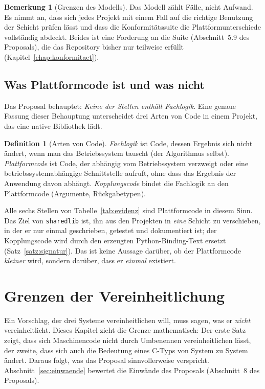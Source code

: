 \documentclass[a4paper,12pt,twoside]{report}
\DeclareRobustCommand{\_}{\ifmmode\mbox{\textunderscore}\else\textunderscore\allowbreak{}\fi}
\theoremstyle{definition}
\newtheorem{definition}{Definition}[chapter]
\newtheorem{bemerkung}{Bemerkung}[chapter]
\begin{document}
\begin{bemerkung}[Grenzen des Modells]
	Das Modell zählt Fälle, nicht Aufwand. Es nimmt an, dass sich jedes Projekt mit einem Fall auf die richtige Benutzung der Schicht prüfen lässt und dass die Konformitätssuite die Plattformunterschiede vollständig abdeckt. Beides ist eine Forderung an die Suite (Abschnitt~5.9 des Proposals), die das Repository bisher nur teilweise erfüllt (Kapitel~\ref{chap:konformitaet}).
\end{bemerkung}

\section{Was Plattformcode ist und was nicht}

Das Proposal behauptet: \emph{Keine der Stellen enthält Fachlogik}. Eine genaue Fassung dieser Behauptung unterscheidet drei Arten von Code in einem Projekt, das eine native Bibliothek lädt.

\begin{definition}[Arten von Code]
	\emph{Fachlogik} ist Code, dessen Ergebnis sich nicht ändert, wenn man das Betriebssystem tauscht (der Algorithmus selbst). \emph{Plattformcode} ist Code, der abhängig vom Betriebssystem verzweigt oder eine betriebssystemabhängige Schnittstelle aufruft, ohne dass das Ergebnis der Anwendung davon abhängt. \emph{Kopplungscode} bindet die Fachlogik an den Plattformcode (Argumente, Rückgabetypen).
\end{definition}

Alle sechs Stellen von Tabelle~\ref{tab:evidenz} sind Plattformcode in diesem Sinn. Das Ziel von \texttt{sharedlib} ist, ihn aus den Projekten in \emph{eine} Schicht zu verschieben, in der er nur einmal geschrieben, getestet und dokumentiert ist; der Kopplungscode wird durch den erzeugten Python-Binding-Text ersetzt (Satz~\ref{satz:signatur}). Das ist keine Aussage darüber, ob der Plattformcode \emph{kleiner} wird, sondern darüber, dass er \emph{einmal} existiert.


\chapter{Grenzen der Vereinheitlichung}
\label{chap:grenzen}

Ein Vorschlag, der drei Systeme vereinheitlichen will, muss sagen, was er \emph{nicht} vereinheitlicht. Dieses Kapitel zieht die Grenze mathematisch: Der erste Satz zeigt, dass sich Maschinencode nicht durch Umbenennen vereinheitlichen lässt, der zweite, dass sich auch die Bedeutung eines C-Typs von System zu System ändert. Daraus folgt, was das Proposal sinnvollerweise verspricht. Abschnitt~\ref{sec:einwaende} bewertet die Einwände des Proposals (Abschnitt~8 des Proposals).
\end{document}
